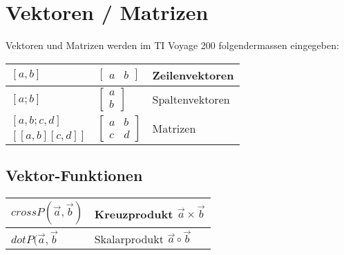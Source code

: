 \section{Vektoren / Matrizen}

Vektoren und Matrizen werden im TI Voyage 200 folgendermassen eingegeben: \\
\begin{tabular}{|l|l|l|}
	\hline
	$ [a,b] $ 			& $ \begin{bmatrix} a & b \end{bmatrix} $ 								& Zeilenvektoren \\ \hline
	$ [a;b] $			& $ \begin{bmatrix} a \\ b \end{bmatrix} $								& Spaltenvektoren \\ \hline
	$ [a,b;c,d] $		& \multirow{2}{*}{ $ \begin{bmatrix}a & b \\ c & d  \end{bmatrix} $ }	& \multirow{2}{*}{Matrizen}\\
	$ [[a,b][c,d]] $	&	& \\ \hline
\end{tabular}

\subsection{Vektor-Funktionen}
\begin{tabular}{|l|l|}
	\hline
	$crossP( \vec{a}, \vec{b})$		& Kreuzprodukt $\vec{a} \times \vec{b}$ \\ \hline
	$dotP( \vec{a}, \vec{b}$		& Skalarprodukt $\vec{a} \circ \vec{b}$ \\ \hline
\end{tabular}

